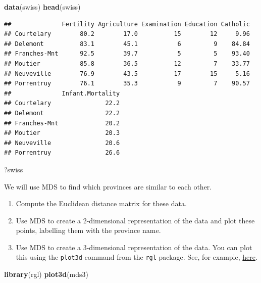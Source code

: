 \documentclass[
]{book}
\newenvironment{Shaded}{\begin{snugshade}}{\end{snugshade}}
\newcommand{\FunctionTok}[1]{\textcolor[rgb]{0.13,0.29,0.53}{\textbf{#1}}}
\newcommand{\NormalTok}[1]{#1}
\theoremstyle{definition}
\theoremstyle{definition}
\theoremstyle{definition}
\theoremstyle{definition}
\theoremstyle{remark}
\begin{document}
\begin{Shaded}
\begin{Highlighting}[]
\FunctionTok{data}\NormalTok{(swiss)}
\FunctionTok{head}\NormalTok{(swiss)}
\end{Highlighting}
\end{Shaded}

\begin{verbatim}
##              Fertility Agriculture Examination Education Catholic
## Courtelary        80.2        17.0          15        12     9.96
## Delemont          83.1        45.1           6         9    84.84
## Franches-Mnt      92.5        39.7           5         5    93.40
## Moutier           85.8        36.5          12         7    33.77
## Neuveville        76.9        43.5          17        15     5.16
## Porrentruy        76.1        35.3           9         7    90.57
##              Infant.Mortality
## Courtelary               22.2
## Delemont                 22.2
## Franches-Mnt             20.2
## Moutier                  20.3
## Neuveville               20.6
## Porrentruy               26.6
\end{verbatim}

\begin{Shaded}
\begin{Highlighting}[]
\NormalTok{?swiss}
\end{Highlighting}
\end{Shaded}

We will use MDS to find which provinces are similar to each other.

\begin{enumerate}
\def\labelenumi{\roman{enumi}.}
\item
  Compute the Euclidean distance matrix for these data.
\item
  Use MDS to create a 2-dimensional representation of the data and plot these points, labelling them with the province name.
\item
  Use MDS to create a 3-dimensional representation of the data. You can plot this using the \texttt{plot3d} command from the \texttt{rgl} package. See, for example, \href{https://rpubs.com/aagarwal29/179912}{here}.
\end{enumerate}

\begin{Shaded}
\begin{Highlighting}[]
\FunctionTok{library}\NormalTok{(rgl)}
\FunctionTok{plot3d}\NormalTok{(mds3)}
\end{Highlighting}
\end{Shaded}
\end{document}
